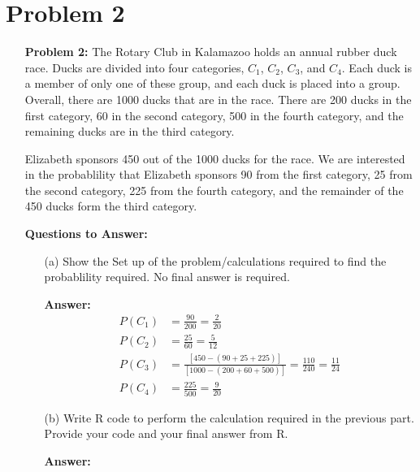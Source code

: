 \documentclass{article}
\begin{document}
\section*{Problem 2}
    \begin{itemize}
        \item[] \textbf{Problem 2:} The Rotary Club in Kalamazoo holds an annual rubber duck race. Ducks are divided
        into four categories, $C_1$, $C_2$, $C_3$, and $C_4$. Each duck is a member of only one of these group, and 
        each duck is placed into a group. Overall, there are 1000 ducks that are in the race. There are 200 ducks in the 
        first category, 60 in the second category, 500 in the fourth category, and the remaining ducks are in the third category.
        \item[]
        \item[] Elizabeth sponsors 450 out of the 1000 ducks for the race. We are interested in the probablility that Elizabeth 
        sponsors 90 from the first category, 25 from the second category, 225 from the fourth category, and the remainder of the 
        450 ducks form the third category.
        \item[] \textbf{Questions to Answer:}
        \begin{itemize}
            \item[(a)] Show the Set up of the problem/calculations required to find the probablility required. No final answer is required.
            \item[] \textbf{Answer:}
            \begin{align*}
                P(C_1) &= \frac{90}{200} = \frac{2}{20}\\
                P(C_2) &= \frac{25}{60} = \frac{5}{12}\\
                P(C_3) &= \frac{[450 - (90 + 25 + 225)]}{[1000 - (200 + 60 + 500)]} = \frac{110}{240} = \frac{11}{24}\\
                P(C_4) &= \frac{225}{500} = \frac{9}{20}
            \end{align*}
        \item[(b)] Write R code to perform the calculation required in the previous part. Provide your code and your final answer from R.
        \item[] \newpage
        \item[] \textbf{Answer:}
        

\end{itemize}
\end{itemize}
\end{document}
